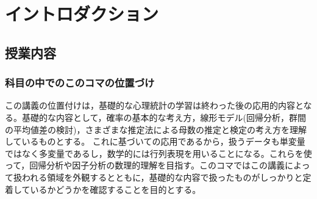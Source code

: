 \section{イントロダクション}
\subsection{授業内容}
\subsubsection{科目の中でのこのコマの位置づけ}
この講義の位置付けは，基礎的な心理統計の学習は終わった後の応用的内容となる。基礎的な内容として，確率の基本的な考え方，線形モデル(回帰分析，群間の平均値差の検討)，さまざまな推定法による母数の推定と検定の考え方を理解しているものとする。
これに基づいての応用であるから，扱うデータも単変量ではなく多変量であるし，数学的には行列表現を用いることになる。これらを使って，回帰分析や因子分析の数理的理解を目指す。このコマではこの講義によって扱われる領域を外観するとともに，基礎的な内容で扱ったものがしっかりと定着しているかどうかを確認することを目的とする。
